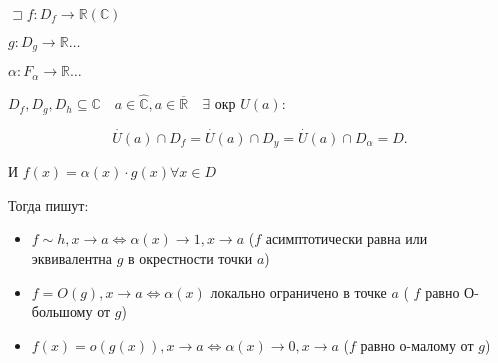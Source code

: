 \documentclass{book}
\newcommand\R{\ensuremath{\mathbb{R}}}
\renewcommand\C{\ensuremath{\mathbb{C}}}
\newcommand{\ov}[1]{\overline{#1}}
\theoremstyle{definition}
\begin{document}
\begin{definition}
    $\sqsupset f:D_f\to \R\left( \C \right) $

    $g:D_g\to \R\ldots$

    $\alpha:F_{\alpha}\to \R\ldots$

    $D_f, D_g, D_h\subseteq \C\quad a\in \widehat{\C}, a\in \ov {\R}\quad \exists $ окр $U(a): $

     \[
         \overset{\cdot }U(a)\cap D_f = \overset{\cdot }U(a) \cap D_y = \overset{\cdot }U(a) \cap D_{\alpha} = D
    .\] 

    И  $f(x) = \alpha(x)\cdot g(x) \forall x\in D$

    Тогда пишут:
    \begin{itemize}
        \item $f\sim h, x\to a \iff  \alpha(x)\to 1, x\to a$ ($f$ асимптотически равна или эквивалентна  $g$ в окрестности точки  $a$) 
        \item $f = O(g), x\to a  \iff \alpha(x)$ локально ограничено в точке $a$ ( $f$ равно О-большому от  $g$)
        \item  $f(x) = o(g(x)), x\to a \iff  \alpha(x) \to 0, x\to a$ ($f$ равно о-малому от  $g$)
    \end{itemize}
\end{definition}
\end{document}
